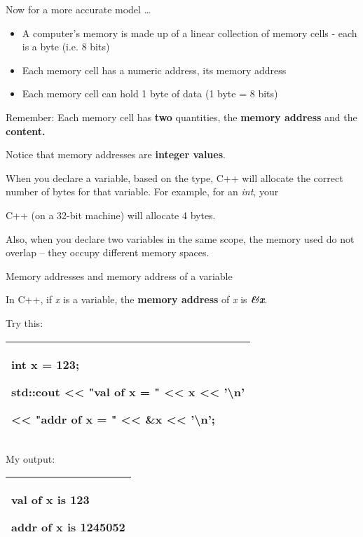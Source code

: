 \documentclass[
]{article}
\providecommand{\tightlist}{%
  \setlength{\itemsep}{0pt}\setlength{\parskip}{0pt}}
\begin{document}
Now for a more accurate model \ldots{}

\begin{itemize}
\tightlist
\item
  A computer's memory is made up of a linear collection of memory cells
  - each is a byte (i.e. 8 bits)
\item
  Each memory cell has a numeric address, its memory address
\item
  Each memory cell can hold 1 byte of data (1 byte = 8 bits)
\end{itemize}

Remember: Each memory cell has \textbf{two} quantities, the
\textbf{memory address} and the \textbf{content.}

Notice that memory addresses are \textbf{integer values}.

When you declare a variable, based on the type, C++ will allocate the
correct number of bytes for that variable. For example, for an
\emph{int}, your

C++ (on a 32-bit machine) will allocate 4 bytes.

Also, when you declare two variables in the same scope, the memory used
do not overlap -- they occupy different memory spaces.

Memory addresses and memory address of a variable

In C++, if \emph{x} is a variable, the \textbf{memory address} of
\emph{x} is \emph{\textbf{\&x}}.

Try this:

\begin{longtable}[]{@{}l@{}}
\toprule
\endhead
\begin{minipage}[t]{0.97\columnwidth}\raggedright
int x = 123;

std::cout \textless\textless{} "val of x = " \textless\textless{} x
\textless\textless{} '\textbackslash n'

\textless\textless{} "addr of x = " \textless\textless{} \textbf{\&x}
\textless\textless{} '\textbackslash n';\strut
\end{minipage}\tabularnewline
\bottomrule
\end{longtable}

My output:

\begin{longtable}[]{@{}l@{}}
\toprule
\endhead
\begin{minipage}[t]{0.97\columnwidth}\raggedright
val of x is 123

addr of x is 1245052\strut
\end{minipage}\tabularnewline
\bottomrule
\end{longtable}
\end{document}
